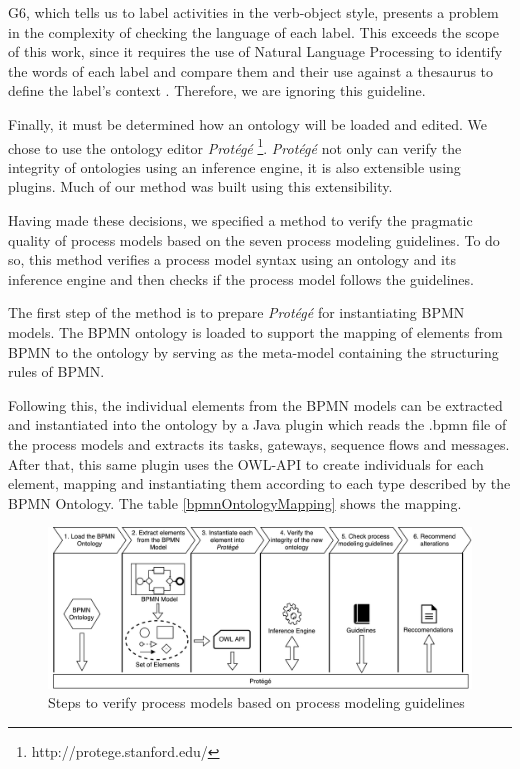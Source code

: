 \documentclass[a4paper,twoside]{article}
\begin{document}
G6, which tells us to label activities in the verb-object style, presents a problem in the complexity of checking the language of each label. This exceeds the scope of this work, since it requires the use of Natural Language Processing to identify the words of each label and compare them and their use against a thesaurus to define the label's context \citep{Gassen2014}. Therefore, we are ignoring this guideline.



Finally, it must be determined how an ontology will be loaded and edited. We chose to use the ontology editor \textit{Protégé} \footnote{http://protege.stanford.edu/}. \textit{Protégé} not only can verify the integrity of ontologies using an inference engine, it is also extensible using plugins. Much of our method was built using this extensibility. %

Having made these decisions, we specified a method to verify the pragmatic quality of process models based on the seven process modeling guidelines. To do so, this method verifies a process model syntax using an ontology and its inference engine and then checks if the process model follows the guidelines.

The first step of the method is to prepare \textit{Protégé} for instantiating BPMN models. The BPMN ontology is loaded to support the mapping of elements from BPMN to the ontology by serving as the meta-model containing the structuring rules of BPMN.

Following this, the individual elements from the BPMN models can be extracted and instantiated into the ontology by a Java plugin which reads the .bpmn file of the process models and extracts its tasks, gateways, sequence flows and messages. After that, this same plugin uses the OWL-API to create individuals for each element, mapping and instantiating them according to each type described by the BPMN Ontology. The table \ref{bpmnOntologyMapping} shows the mapping.

\begin{figure}
	\includegraphics[width=\textwidth ]{method.pdf}
	\caption{Steps to verify process models based on process modeling guidelines}
	\label{methodFigure}
\end{figure}
\end{document}

